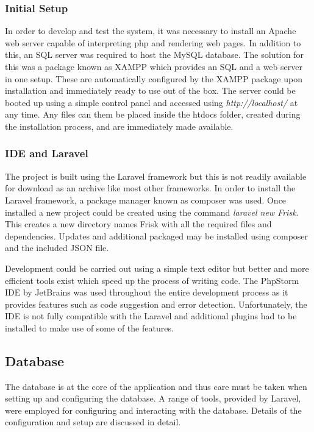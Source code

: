 \subsubsection{Initial Setup}
In order to develop and test the system, it was necessary to install an Apache web server capable of interpreting php and rendering web pages. In addition to this, an SQL server was required to host the MySQL database. The solution for this was a package known as XAMPP which provides an SQL and a web server in one setup. These are automatically configured by the XAMPP package upon installation and immediately ready to use out of the box. The server could be booted up using a simple control panel and accessed using \emph{http://localhost/} at any time. Any files can them be placed inside the htdocs folder, created during the installation process, and are immediately made available. 

\subsubsection{IDE and Laravel}
The project is built using the Laravel framework but this is not readily available for download as an archive like most other frameworks. In order to install the Laravel framework, a package manager known as composer was used. Once installed a new project could be created using the command \emph{laravel new Frisk}. This creates a new directory names Frisk with all the required files and dependencies. Updates and additional packaged may be installed using composer and the included JSON file.

Development could be carried out using a simple text editor but better and more efficient tools exist which speed up the process of writing code. The PhpStorm IDE by JetBrains was used throughout the entire development process as it provides features such as code suggestion and error detection. Unfortunately, the IDE is not fully compatible with the Laravel and additional plugins had to be installed to make use of some of the features.

\subsection{Database}
The database is at the core of the application and thus care must be taken when setting up and configuring the database. A range of tools, provided by Laravel, were employed for configuring and interacting with the database. Details of the configuration and setup are discussed in detail.

